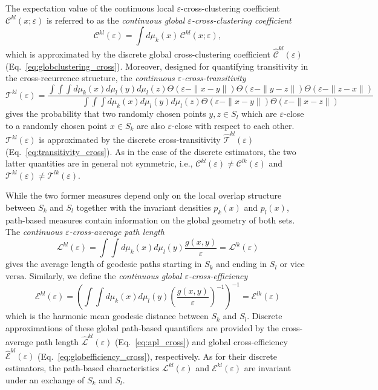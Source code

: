 The expectation value of the continuous local $\varepsilon$-cross-clustering coefficient $\mathcal{C}^{kl}(x;\varepsilon)$ is referred to as the \textit{continuous global $\varepsilon$-cross-clustering coefficient}
\begin{equation}
\mathcal{C}^{kl}(\varepsilon) = \int d\mu_k(x)\, \mathcal{C}^{kl}(x;\varepsilon),
\end{equation}
which is approximated by the discrete global cross-clustering coefficient $\hat{\mathcal{C}}^{kl}(\varepsilon)$ (Eq.~\ref{eq:globclustering_cross}). Moreover, designed for quantifying transitivity in the cross-recurrence struc\-ture, the \textit{continuous $\varepsilon$-cross-transitivity} 
\begin{equation}
\mathcal{T}^{kl}(\varepsilon) = \frac{\int\!\!\!\int\!\!\!\int d\mu_k(x) d\mu_l(y) d\mu_l(z) \Theta(\varepsilon-\|x - y\|) \Theta(\varepsilon-\|y - z\|) \Theta(\varepsilon-\|z - x\|)}{\int\!\!\!\int\!\!\!\int d\mu_k(x) d\mu_l(y) d\mu_l(z) \Theta(\varepsilon-\|x - y\|) \Theta(\varepsilon-\|x - z\|)}
\end{equation}
gives the probability that two randomly chosen points $y,z\in S_l$ which are $\varepsilon$-close to a randomly chosen point $x\in S_k$ are also $\varepsilon$-close with respect to each other. $\mathcal{T}^{kl}(\varepsilon)$ is approximated by the discrete cross-transitivity $\hat{\mathcal{T}}^{kl}(\varepsilon)$ (Eq.~\ref{eq:transitivity_cross}). As in the case of the discrete estimators, the two latter quantities are in general not symmetric, i.e., $\mathcal{C}^{kl}(\varepsilon) \neq \mathcal{C}^{lk}(\varepsilon)$ and $\mathcal{T}^{kl}(\varepsilon) \neq \mathcal{T}^{lk}(\varepsilon)$.

While the two former measures depend only on the local overlap structure between $S_k$ and $S_l$ together with the invariant densities $p_k(x)$ and $p_l(x)$, path-based measures contain information on the global geometry of both sets. The \textit{continuous $\varepsilon$-cross-average path length}
\begin{equation}
\mathcal{L}^{kl}(\varepsilon) = \int\!\!\!\int d\mu_k(x) d\mu_l(y) \frac{g(x,y)}{\varepsilon} = \mathcal{L}^{lk}(\varepsilon)
\end{equation}
gives the average length of geodesic paths starting in $S_k$ and ending in $S_l$ or vice versa. Similarly, we define the \textit{continuous global $\varepsilon$-cross-efficiency} 
\begin{equation}
\mathcal{E}^{kl}(\varepsilon) = \left( \int\!\!\!\int d\mu_k(x) d\mu_l(y) \left( \frac{g(x,y)}{\varepsilon} \right)^{-1} \right)^{-1} = \mathcal{E}^{lk}(\varepsilon)
\end{equation}
which is the harmonic mean geodesic distance between $S_k$ and $S_l$. Discrete approximations of these global path-based quantifiers are provided by the cross-average path length $\hat{\mathcal{L}}^{kl}(\varepsilon)$ (Eq.~\ref{eq:apl_cross}) and global cross-efficiency $\hat{\mathcal{E}}^{kl}(\varepsilon)$ (Eq.~\ref{eq:globefficiency_cross}), respectively. As for their discrete estimators, the path-based characteristics $\mathcal{L}^{kl}(\varepsilon)$ and $\mathcal{E}^{kl}(\varepsilon)$ are invariant under an exchange of $S_k$ and $S_l$.



